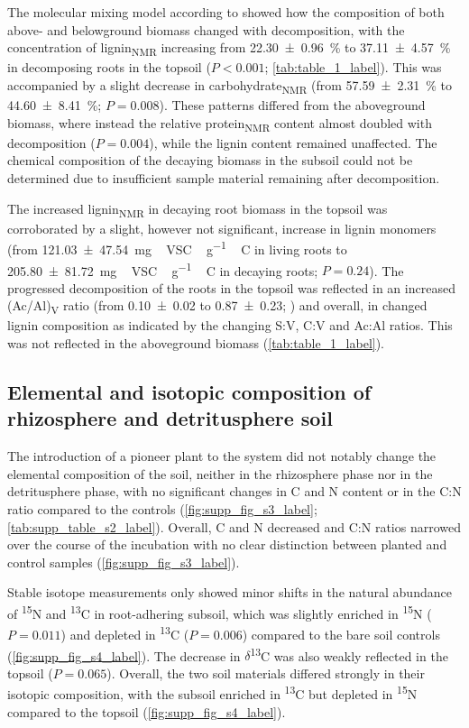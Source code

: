 The molecular mixing model according to \citet{Nelson2005} showed how the composition of both above- and belowground biomass changed with decomposition, with the concentration of lignin\textsubscript{NMR} increasing from \SI{22.30 \pm 0.96}{\percent} to \SI{37.11 \pm 4.57}{\percent} in decomposing roots in the topsoil (\(P < 0.001\); \cref{tab:table_1_label}). This was accompanied by a slight decrease in carbohydrate\textsubscript{NMR} (from \SI{57.59 \pm 2.31}{\percent} to \SI{44.60 \pm 8.41}{\percent}; \(P= 0.008\)). These patterns differed from the aboveground biomass, where instead the relative protein\textsubscript{NMR} content almost doubled with decomposition (\(P=0.004\)), while the lignin content remained unaffected. The chemical composition of the decaying biomass in the subsoil could not be determined due to insufficient sample material remaining after decomposition.

The increased lignin\textsubscript{NMR} in decaying root biomass in the topsoil was corroborated by a slight, however not significant, increase in lignin monomers (from \SI{121.03 \pm 47.54}{mg\,VSC\,\gram^{-1}\,C} in living roots to \SI{205.80 \pm 81.72}{mg\,VSC\,\gram^{-1}\,C} in decaying roots; \(P=0.24\)). The progressed decomposition of the roots in the topsoil was reflected in an increased (Ac/Al)\textsubscript{V} ratio (from \num{0.10 \pm 0.02} to \num{0.87 \pm 0.23}; \citealp{KoegelKnabner1988}) and overall, in changed lignin composition as indicated by the changing S:V, C:V and Ac:Al ratios. This was not reflected in the aboveground biomass (\cref{tab:table_1_label}).

\subsection{Elemental and isotopic composition of rhizosphere and detritusphere soil}

The introduction of a pioneer plant to the system did not notably change the elemental composition of the soil, neither in the rhizosphere phase nor in the detritusphere phase, with no significant changes in C and N content or in the C:N ratio compared to the controls (\cref{fig:supp_fig_s3_label}; \cref{tab:supp_table_s2_label}). Overall, C and N decreased and C:N ratios narrowed over the course of the incubation with no clear distinction between planted and control samples (\cref{fig:supp_fig_s3_label}).

Stable isotope measurements only showed minor shifts in the natural abundance of \textsuperscript{15}N and \textsuperscript{13}C in root-adhering subsoil, which was slightly enriched in \textsuperscript{15}N (\(P=0.011\)) and depleted in \textsuperscript{13}C (\(P=0.006\)) compared to the bare soil controls (\cref{fig:supp_fig_s4_label}). The decrease in \(\delta\)\textsuperscript{13}C was also weakly reflected in the topsoil (\(P=0.065\)). Overall, the two soil materials differed strongly in their isotopic composition, with the subsoil enriched in \textsuperscript{13}C but depleted in \textsuperscript{15}N compared to the topsoil (\cref{fig:supp_fig_s4_label}).


